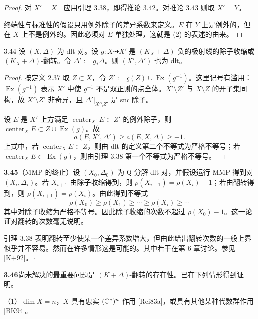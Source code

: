 \begin{proof}
对 $X'=X^{+}$ 应用引理 3.38，即得推论 3.42。对推论 3.43 则取 $X'=Y$。

终端性与标准性的假设只用例外除子的差异系数来定义。$E$ 在 $Y$ 上是例外的，但在 $X$ 上不是例外的。因此必须对 $E$ 单独处理，这就是 (2) 的表述的由来。
\end{proof}

\begin{corollaryp}{3.44}
设 $(X,\Delta)$ 为 dlt 对。设 $g:X\dashrightarrow X'$ 是 $(K_X+\Delta)$-负的极射线的除子收缩或 $(K_X+\Delta)$-翻转。令 $\Delta':=g_*\Delta$。则 $(X',\Delta')$ 也为 dlt。
\end{corollaryp}

\begin{proof}
按定义 2.37 取 $Z\subset X$，令 $Z':=g(Z)\cup\operatorname{Ex}(g^{-1})$。这里记号有滥用：$\operatorname{Ex}(g^{-1})$ 表示 $X'$ 中使 $g^{-1}$ 不是双正则的点全体。$X'\setminus Z'$ 与 $X\setminus Z$ 的开子集同构，故 $X'\setminus Z'$ 非奇异，且 $\Delta'|_{X'\setminus Z'}$ 是 snc 除子。

设 $E$ 是 $X'$ 上方满足 $\operatorname{center}_{X'}E\subset Z'$ 的例外除子，则 $\operatorname{center}_XE\subset Z\cup\operatorname{Ex}(g)$。故
\[
a(E,X',\Delta')\ge a(E,X,\Delta)\ge-1.
\]
上式中，若 $\operatorname{center}_XE\subset Z$，则由 dlt 的定义第二个不等式为严格不等号；若 $\operatorname{center}_XE\subset\operatorname{Ex}(g)$，则由引理 3.38 第一个不等式为严格不等号。
\end{proof}

\par\medskip\noindent\textbf{3.45}（MMP 的终止）\quad 设 $(X_0,\Delta_0)$ 为 Q-分解 dlt 对，并假设运行 MMP 得到对 $(X_i,\Delta_i)$。若 $X_{i+1}$ 由除子收缩得到，则 $\rho(X_{i+1})=\rho(X_i)-1$；若由翻转得到，则 $\rho(X_{i+1})=\rho(X_i)$。由此得到不等式
\[
\rho(X_0)\ge\rho(X_1)\ge\cdots\ge\rho(X_i)\ge\cdots
\]
其中对除子收缩为严格不等号。因此除子收缩的次数不超过 $\rho(X_0)-1$。这一论证对翻转的次数毫无说明。

引理 3.38 表明翻转至少使某一个差异系数增大，但由此给出翻转次数的一般上界似乎并不容易。然而在许多情形这是可能的。其中若干在第 6 章讨论。参见 [K+92]。\hfill$\square$

\par\medskip\noindent\textbf{3.46}\quad 尚未解决的最重要问题是 $(K+\Delta)$-翻转的存在性。已在下列情形得到证明。

\par\noindent（1）$\dim X=n$，$X$ 具有忠实 $(\mathbb{C}^*)^n$-作用 [Rei83a]，或具有其他某种代数群作用 [BK94]。
